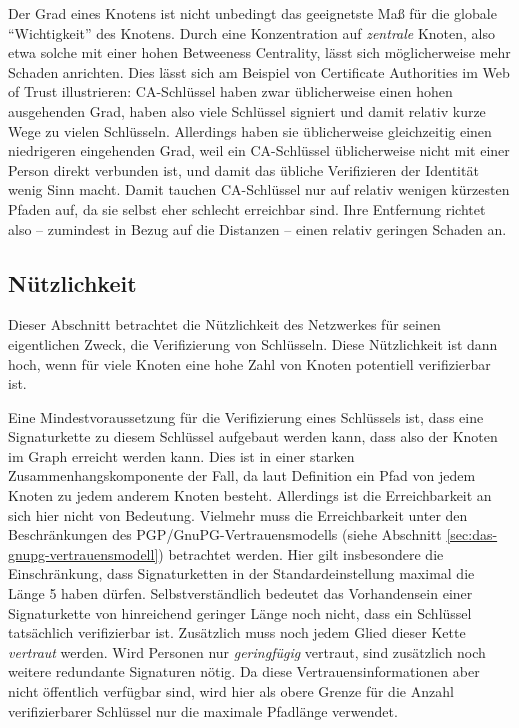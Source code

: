 Der Grad eines Knotens ist nicht unbedingt das geeignetste Ma{\ss} für
die globale "`Wichtigkeit"' des Knotens. Durch eine Konzentration auf
\emph{zentrale} Knoten, also etwa solche mit einer hohen Betweeness
Centrality, lässt sich möglicherweise mehr Schaden anrichten. Dies
lässt sich am Beispiel von Certificate Authorities im Web of Trust
illustrieren: CA-Schlüssel haben zwar üblicherweise einen hohen
ausgehenden Grad, haben also viele Schlüssel signiert und damit
relativ kurze Wege zu vielen Schlüsseln. Allerdings haben sie
\"ublicherweise gleichzeitig einen niedrigeren eingehenden Grad, weil ein CA-Schlüssel
üblicherweise nicht mit einer Person direkt verbunden ist, und damit
das übliche Verifizieren der Identität wenig Sinn macht. Damit tauchen
CA-Schlüssel nur auf relativ wenigen kürzesten Pfaden auf, da sie
selbst eher schlecht erreichbar sind. Ihre Entfernung richtet also --
zumindest in Bezug auf die Distanzen -- einen relativ geringen Schaden
an.

\subsection{Nützlichkeit}
\label{sec:nutzlichkeit}
Dieser Abschnitt betrachtet die Nützlichkeit des Netzwerkes für
seinen eigentlichen Zweck, die Verifizierung von Schlüsseln. Diese
Nützlichkeit ist dann hoch, wenn für viele Knoten eine hohe Zahl
von Knoten potentiell verifizierbar ist.

Eine Mindestvoraussetzung für die Verifizierung eines Schlüssels
ist, dass eine Signaturkette zu diesem Schlüssel aufgebaut werden
kann, dass also der Knoten im Graph erreicht werden kann. Dies ist in
einer starken Zusammenhangskomponente der Fall, da laut Definition ein
Pfad von jedem Knoten zu jedem anderem Knoten besteht. Allerdings ist
die Erreichbarkeit an sich hier nicht von Bedeutung. Vielmehr muss die
Erreichbarkeit unter den Beschränkungen des
PGP/GnuPG-Vertrauensmodells (siehe Abschnitt
\ref{sec:das-gnupg-vertrauensmodell}) betrachtet werden. Hier gilt
insbesondere die Einschränkung, dass Signaturketten in der
Standardeinstellung maximal die Länge 5 haben
dürfen. Selbstverständlich bedeutet das Vorhandensein einer
Signaturkette von hinreichend geringer Länge noch nicht, dass ein
Schlüssel tatsächlich verifizierbar ist. Zusätzlich muss noch
jedem Glied dieser Kette \emph{vertraut} werden. Wird Personen nur
\emph{geringfügig} vertraut, sind zusätzlich noch weitere
redundante Signaturen nötig. Da diese Vertrauensinformationen aber
nicht öffentlich verfügbar sind, wird hier als obere Grenze für
die Anzahl verifizierbarer Schlüssel nur die maximale Pfadlänge
verwendet.

